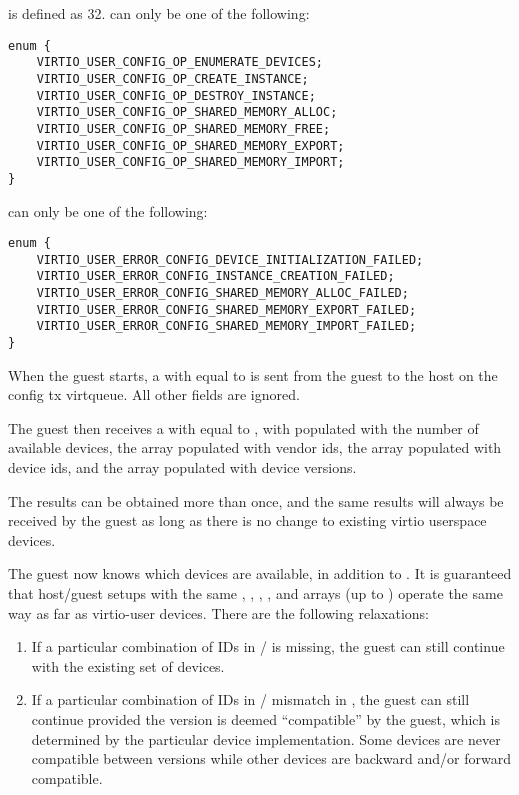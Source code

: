  is defined as 32.
 can only be one of the following:

\begin{lstlisting}
enum {
    VIRTIO_USER_CONFIG_OP_ENUMERATE_DEVICES;
    VIRTIO_USER_CONFIG_OP_CREATE_INSTANCE;
    VIRTIO_USER_CONFIG_OP_DESTROY_INSTANCE;
    VIRTIO_USER_CONFIG_OP_SHARED_MEMORY_ALLOC;
    VIRTIO_USER_CONFIG_OP_SHARED_MEMORY_FREE;
    VIRTIO_USER_CONFIG_OP_SHARED_MEMORY_EXPORT;
    VIRTIO_USER_CONFIG_OP_SHARED_MEMORY_IMPORT;
}
\end{lstlisting}

 can only be one of the following:

\begin{lstlisting}
enum {
    VIRTIO_USER_ERROR_CONFIG_DEVICE_INITIALIZATION_FAILED;
    VIRTIO_USER_ERROR_CONFIG_INSTANCE_CREATION_FAILED;
    VIRTIO_USER_ERROR_CONFIG_SHARED_MEMORY_ALLOC_FAILED;
    VIRTIO_USER_ERROR_CONFIG_SHARED_MEMORY_EXPORT_FAILED;
    VIRTIO_USER_ERROR_CONFIG_SHARED_MEMORY_IMPORT_FAILED;
}
\end{lstlisting}

When the guest starts, a 
with   equal to  is sent
from the guest to the host on the config tx virtqueue. All other fields are ignored.

The guest then receives a 
with  equal to ,
with  populated with the number of available devices,
the  array populated with  vendor ids,
the  array populated with  device ids,
and the  array populated with  device versions.

The results can be obtained more than once, and the same results will always be received
by the guest as long as there is no change to existing virtio userspace devices.

The guest now knows which devices are available, in addition to .
It is guaranteed that host/guest setups with the same ,
, , ,
and  arrays (up to )
operate the same way as far as virtio-user devices.
There are the following relaxations:

\begin{enumerate}
\item If a particular combination of IDs in  /  is missing,
the guest can still continue with the existing set of devices.
\item If a particular combination of IDs in  /  mismatch in ,
the guest can still continue provided the version is deemed ``compatible'' by the guest,
which is determined by the particular device implementation.
Some devices are never compatible between versions
while other devices are backward and/or forward compatible.
\end{enumerate}

